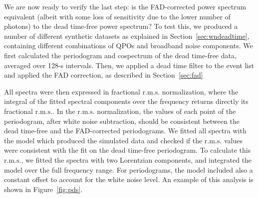 \documentclass[twocolumn]{aastex61}
\newcommand{\project}[1]{\textsl{#1}}
\newcommand{\nustar}{\project{NuSTAR}\xspace}
\newcommand{\rms}{\ensuremath{\mathrm{r.m.s.}}\xspace}
\begin{document}
\begin{figure*}
    \caption{Periodograms and cospectra from a simulation with four Lorentzian features (at 50, 200, 300 and 400 Hz) with 40-Hz full with at half maximum (FWHM). 
    We plotted and fitted periodograms and cospectra before and after applying the dead time filter
    The total \rms before dead time was 40\% and the incident photon flux 400 ct/s. 
    After applying a dead time of 2.5 ms like in \nustar, the ``detected'' photon flux decreased to $\sim$200 ct/s as expected. 
    As can be seen from the best-fit curves, there is no significant difference between FAD-normalized and deadtime-free periodograms and cospectra.
    For comparison, we also plot the cospectrum without FAD (pink), showing very different amplitudes for the four Lorentzians, due to dead time.
    }
    \label{fig:pds}
\end{figure*}

We are now ready to verify the last step: is the FAD-corrected power spectrum equivalent (albeit with some loss of sensitivity due to the lower number of photons) to the dead time-free power spectrum?
To test this, we produced a number of different synthetic datasets as explained in Section~\ref{sec:wndeadtime}, containing different combinations of QPOs and broadband noise components. 
We first calculated the periodogram and cospectrum of the dead time-free data, averaged over 128-s intervals.
Then, we applied a dead time filter to the event list and applied the FAD correction, as described in Section~\ref{sec:fad}

All spectra were then expressed in fractional \rms \citep{BelloniHasinger90,Miyamoto+91} normalization, where the integral of the fitted spectral components over the frequency returns directly its fractional \rms.
In the \rms normalization, the values of each point of the periodogram, after white noise subtraction, should be consistent between the dead time-free and the FAD-corrected periodograms.
We fitted all spectra with the model which produced the simulated data and checked if the \rms values were consistent with the fit on the dead time-free periodogram.
To calculate this \rms, we fitted the spectra with two Lorentzian components, and integrated the model over the full frequency range.
For periodograms, the model included also a constant offset to account for the white noise level.
An example of this analysis is shown in Figure~\ref{fig:pds}.
\end{document}
